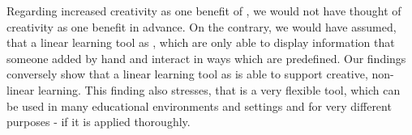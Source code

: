 Regarding increased creativity as one benefit of \AR \appsns, we would not have thought of creativity as one benefit in advance. On the contrary, we would have assumed, that a linear learning tool as \AR \appsns, which are only able to display information that someone added by hand and interact in ways which are predefined. Our findings conversely show that a linear learning tool as \AR \apps is able to support creative, non-linear learning. This finding also stresses, that \AR is a very flexible tool, which can be used in many educational environments and settings and for very different purposes - if it is applied thoroughly. %
\\

